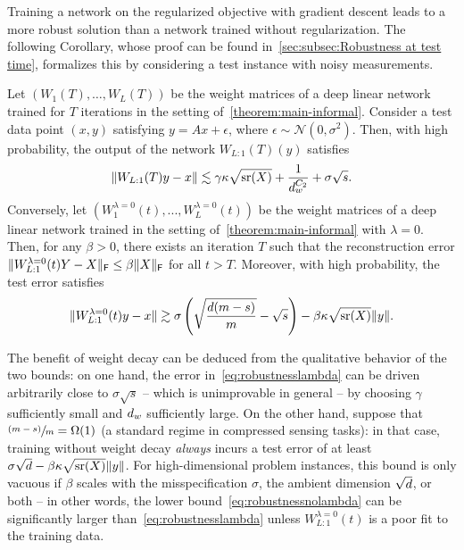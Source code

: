 Training a network on the regularized objective with gradient descent leads to a more robust solution than a network trained without regularization. The following Corollary, whose proof can be found in~\cref{sec:subsec:Robustness at test time}, formalizes this by considering a test instance with noisy measurements.
\begin{corollary}
	\label{cor:robustness}
	Let $(W_1(T), \dots, W_{L}(T))$ be the weight matrices of a deep linear
	network trained for $T$ iterations in the setting of~\cref{theorem:main-informal}.
	Consider a test data point $(x, y)$ satisfying $y=Ax+\epsilon$, where
	$\epsilon \sim \mathcal{N}(0, \sigma^2)$.
	Then, with high probability, the output of the network $W_{L:1}(T)(y)$ satisfies
	\begin{equation}\label{eq:robustnesslambda}
		\lVert W_{L:1}(T)y - x\rVert \lesssim
		\gamma \kappa \sqrt{\operatorname{\mathrm{sr}}(X)}  + \frac{1}{d_{w}^{C_2}}
		+ \sigma \sqrt{s}.
	\end{equation}
	Conversely, let $(W^{\lambda=0}_1(t),...,W^{\lambda=0}_L(t))$
	be the weight matrices of a deep linear network trained in the setting of~\cref{theorem:main-informal} with $\lambda = 0$. Then, for any $\beta >0$, there exists an iteration $T$ such that the reconstruction error $\lVert W_{L:1}^{\lambda = 0}(t)Y-X\rVert_{\mathsf{F}} \leq \beta \lVert X\rVert_{\mathsf{F}}$ for all $t>T$. Moreover, with high probability, the test error satisfies
	\begin{equation}\label{eq:robustnessnolambda}
		\lVert W^{\lambda=0}_{L:1}(t)y-x\rVert \gtrsim
		\sigma \left(\sqrt{\frac{d(m - s)}{m}} - \sqrt{s}\right) -
		\beta \kappa \sqrt{\operatorname{\mathrm{sr}}(X)} \lVert y\rVert.
	\end{equation}
\end{corollary}
The benefit of weight decay can be deduced from the qualitative behavior of the two bounds: on one hand,
the error in~\cref{eq:robustnesslambda} can be driven
arbitrarily close to $\sigma \sqrt{s}$ -- which is unimprovable in general -- by choosing $\gamma$ sufficiently small and $d_{w}$ sufficiently large.
On the other hand, suppose that $\sfrac{(m - s)}{m} = \Omega(1)$
(a standard regime in compressed sensing tasks): in that case, training without weight decay \emph{always} incurs a
test error of at least $\sigma \sqrt{d} - \beta \kappa \sqrt{\operatorname{\mathrm{sr}}(X)} \lVert y\rVert$. For high-dimensional problem instances,
this bound is only vacuous if $\beta$ scales with the misspecification $\sigma$, the ambient dimension $\sqrt{d}$, or both -- in other words, the lower bound~\eqref{eq:robustnessnolambda} can be significantly larger than~\eqref{eq:robustnesslambda}
unless $W_{L:1}^{\lambda = 0}(t)$ is a poor fit
to the training data.
